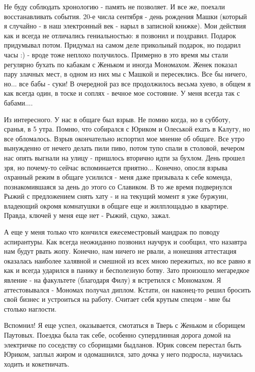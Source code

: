 \documentclass[12pt,a4paper]{article}
\begin{document}
Не буду соблюдать хронологию - память не позволяет. И все же, поехали восстанавливать события. 20-е числа сентября - день рождения Машки (который я случайно - в наш электронный век - нарыл в записной книжке). Мои действия как и всегда не отличались гениальностью: я позвонил и поздравил. Подарок придумывал потом. Придумал на самом деле прикольный подарок, но подарил часы :) - вроде тоже неплохо получилось. Примерно в это время мы стали регулярно бухать по кабакам с Женьком и иногда Мономахом. Женек показал пару злачных мест, в одном из них мы с Машкой и пересеклись. Все бы ничего, но... все бабы - суки! В очередной раз все продолжилось весьма хуево, в общем я как всегда один, в тоске и соплях - вечное мое состояние. У меня всегда так с бабами....

Из интересного. У нас в общаге был взрыв. Не помню когда, но в субботу, сранья, в 5 утра. Помню, что собирался с Юриком и Олеськой ехать в Калугу, но все обломалось. Взрыв окончательно испортил мое мнение об общаге. Все утро вынужденно от нечего делать пили пиво, потом тупо спали в столовой, вечером нас опять выгнали на улицу - пришлось вторично идти за бухлом. День прошел зря, но почему-то сейчас вспоминается приятно... Конечно, опосля взрыва охранный режим в общаге усилился - меня даже призывала к себе коменда, познакомившаяся за день до этого со Славиком. В то же время подвернулся Рыжий с предложением снять хату - и на текущий момент я уже буржуин, владеющий окромя комнатушки в общаге еще и жилплощадью в квартире. Правда, ключей у меня еще нет - Рыжий, сцуко, зажал.

А еще у меня только что кончился ежесеместровый мандраж по поводу аспирантуры. Как всегда неожиданно позвонил научрук и сообщил, что назавтра нам будут рвать жопу. Конечно, нам ничего не рвали, а нонешняя аттестация оказалась наиболее халявной и смешной из всех мною пережитых, но все равно я как и всегда ударился в панику и бесполезную ботву. Зато произошло мегаредкое явление - на факультете (благодаря Филу) я встретился с Мономахом. Я аттестовывался - Мономах получал диплом. Кстати, он наконец-то решил бросить свой бизнес и устроиться на работу. Считает себя крутым спецом - мне бы столько наглости.

Вспомнил! Я еще успел, оказывается, смотаться в Тверь с Женьком и сборищем Паутовых. Поездка была так себе, особенно супердлинная дорога домой на электричке по соседству со сборищами быдланов. Юрик совсем перестал быть Юриком, заплыл жиром и одомашнился, зато дочка у него подросла, научилась ходить и кокетничать.
\end{document}
